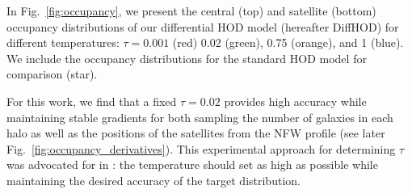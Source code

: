 \documentclass[a4paper,usenatbib]{mnras}
\newcommand{\dhod}{{\sc DiffHOD}}
\begin{document}
In Fig.~\ref{fig:occupancy}, we present the central (top) and 
satellite (bottom) occupancy distributions of our differential HOD 
model (hereafter \dhod) for different temperatures: 
$\tau = 0.001$ (red) 0.02 (green), 0.75 (orange), and 1 (blue). 
We include the occupancy distributions for the standard HOD model for
comparison (star).

For this work, we find that a fixed $\tau=0.02$ provides high accuracy 
while maintaining stable gradients for both sampling the number of 
galaxies in each halo as well as the positions of the satellites from 
the NFW profile (see later Fig.~\ref{fig:occupancy_derivatives}). 
This experimental approach for determining $\tau$ was advocated for in \citet{2016arXiv161100712M}:
the temperature should set as high as possible while maintaining the 
desired accuracy of the target distribution. 



\end{document}
